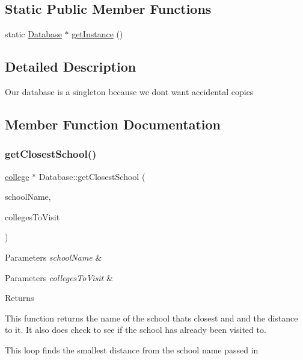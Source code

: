 \subsection*{Static Public Member Functions}
\begin{DoxyCompactItemize}
\item 
static \hyperlink{class_database}{Database} $\ast$ \hyperlink{class_database_a5a3b028f980a577ea0b809eb92312761}{get\+Instance} ()
\end{DoxyCompactItemize}


\subsection{Detailed Description}
Our database is a singleton because we dont want accidental copies 

\subsection{Member Function Documentation}
\mbox{\label{class_database_affe7eb5c35db111e3ff7dc752f5a6c38}} 
\subsubsection{\texorpdfstring{get\+Closest\+School()}{getClosestSchool()}}
{\footnotesize\ttfamily \hyperlink{classcollege}{college} $\ast$ Database\+::get\+Closest\+School (\begin{DoxyParamCaption}\item[{Q\+String}]{school\+Name,  }\item[{Q\+Vector$<$ \hyperlink{classcollege}{college} $\ast$$>$}]{colleges\+To\+Visit }\end{DoxyParamCaption})}


\begin{DoxyItemize}
\item 
\begin{DoxyParams}{Parameters}
{\em school\+Name} & \\
\hline
\end{DoxyParams}

\item 
\begin{DoxyParams}{Parameters}
{\em colleges\+To\+Visit} & \\
\hline
\end{DoxyParams}

\item \begin{DoxyReturn}{Returns}

\end{DoxyReturn}
This function returns the name of the school thats closest and and the distance to it. It also does check to see if the school has already been visited to. 
\end{DoxyItemize}This loop finds the smallest distance from the school name passed in

